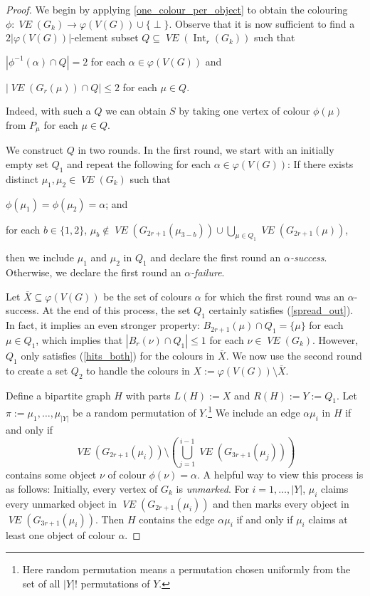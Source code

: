 \documentclass{patmorin}
\DeclareMathOperator{\interior}{Int}
\newcommand{\defin}[1]{\emph{\color{brightmaroon}#1}}
\DeclareMathOperator{\VE}{\mathit{VE}}
\begin{document}
\begin{proof}
  We begin by applying \cref{one_colour_per_object} to obtain the colouring $\phi:\VE(G_k)\to\varphi(V(G))\cup\{\perp\}$.  Observe that it is now sufficient to find a $2|\varphi(V(G))|$-element subset $Q\subseteq\VE(\interior_r(G_k))$ such that
  \begin{compactenum}[(i)]
    \item $|\phi^{-1}(\alpha)\cap Q|= 2$ for each $\alpha\in\varphi(V(G))$ and
    \item $|\VE(G_r(\mu))\cap Q|\le 2$ for each $\mu\in Q$.
  \end{compactenum}
  Indeed, with such a $Q$ we can obtain $S$ by taking one vertex of colour $\phi(\mu)$ from $P_\mu$ for each $\mu\in Q$.

  We construct $Q$ in two rounds.  In the first round, we start with an initially empty set $Q_1$ and repeat the following for each $\alpha\in\varphi(V(G))$:
  If there exists distinct $\mu_1,\mu_2\in\VE(G_k)$ such that
  \begin{compactenum}[(a)]
    \item $\phi(\mu_1)=\phi(\mu_2)=\alpha$; and\label{hits_both_q}
    \item for each $b\in\{1,2\}$, $\mu_b\not\in \VE(G_{2r+1}(\mu_{3-b})) \cup \bigcup_{\mu\in Q_1} \VE(G_{2r+1}(\mu))$,\label{spread_out_q}
  \end{compactenum}
  then we include $\mu_1$ and $\mu_2$ in $Q_1$ and declare the first round an \defin{$\alpha$-success}.  Otherwise, we declare the first round an \defin{$\alpha$-failure}.

  Let $\overline{X}\subseteq\varphi(V(G))$ be the set of colours $\alpha$ for which the first round was an $\alpha$-success. At the end of this process, the set $Q_1$ certainly satisfies (\ref{spread_out}).  In fact, it implies an even stronger property: $B_{2r+1}(\mu)\cap Q_1=\{\mu\}$ for each $\mu\in Q_1$, which implies that $|B_r(\nu)\cap Q_1|\le 1$ for each $\nu\in\VE(G_k)$. However, $Q_1$ only satisfies (\ref{hits_both}) for the colours in $\overline{X}$.  We now use the second round to create a set $Q_2$ to handle the colours in $X:=\varphi(V(G))\setminus \overline{X}$.

  Define a bipartite graph $H$ with parts $L(H):=X$ and $R(H):=Y:=Q_1$.  Let $\pi:=\mu_1,\ldots,\mu_{|Y|}$ be a random permutation of $Y$.\footnote{Here random permutation means a permutation chosen uniformly from the set of all $|Y|!$ permutations of $Y$.}  We include an edge $\alpha\mu_i$ in $H$ if and only if
  \[
    \VE(G_{2r+1}(\mu_i))\setminus\left(\bigcup_{j=1}^{i-1}\VE(G_{3r+1}(\mu_j))\right)
  \]
  contains some object $\nu$ of colour $\phi(\nu)=\alpha$.  A helpful way to view this process is as follows: Initially, every vertex of $G_k$ is \defin{unmarked}.  For $i=1,\ldots,|Y|$, $\mu_i$ claims every unmarked object in $\VE(G_{2r+1}(\mu_i))$ and then marks every object in $\VE(G_{3r+1}(\mu_i))$. Then $H$ contains the edge $\alpha\mu_i$ if and only if $\mu_i$ claims at least one object of colour $\alpha$.


\end{proof}
\end{document}
